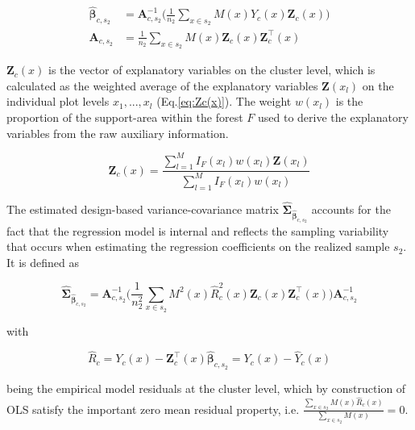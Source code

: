 \documentclass[remotesensing,article,submit,moreauthors,pdftex,10pt,a4paper]{mdpi}
\begin{document}
\begin{subequations}\label{normequ_simple_cluster}
	\begin{align}
	\hat{\pmb{\beta}}_{c,s_2} &= \pmb{A}_{c,s_2}^{-1} \Big(\frac{1}{n_2}\sum_{x\in{s_2}}M(x)Y_{c}(x)\pmb{Z}_{c}(x)\Big) \\
	\pmb{A}_{c,s_2} &=\frac{1}{n_2}\sum_{x\in{s_2}}M(x)\pmb{Z}_{c}(x)\pmb{Z}_{c}^{\top}(x)
	\end{align}
\end{subequations}

\noindent $\pmb{Z}_{c}(x)$ is the vector of explanatory variables on the cluster level, which is calculated as the weighted average of the explanatory variables $\pmb{Z}(x_l)$ on the individual plot levels $x_1, ..., x_l$ (Eq.\ref{eq:Zc(x)}). The weight $w(x_l)$ is the proportion of the support-area within the forest $F$ used to derive the explanatory variables from the raw auxiliary information.

\begin{equation}\label{eq:Zc(x)}
\pmb{Z}_{c}(x)=\frac{\sum_{l=1}^{M}I_{F}(x_l)w(x_l)\pmb{Z}(x_l)}{\sum_{l=1}^{M}I_{F}(x_l)w(x_l)}
\end{equation}

\noindent The estimated design-based variance-covariance matrix $\hat{\pmb{\Sigma}}_{\hat{\pmb{\beta}}_{c,s_2}}$ accounts for the fact that the regression model is internal and reflects the sampling variability that occurs when estimating the regression coefficients on the realized sample $s_2$. It is defined as

\begin{equation}\label{eq:varcovarbeta}
\hat{\pmb{\Sigma}}_{\hat{\pmb{\beta}}_{c,s_2}}=\pmb{A}_{c,s_2}^{-1}
\Big(\frac{1}{n_2^2}\sum_{x\in{s_2}}M^{2}(x)\hat{R}_{c}^2(x)\pmb{Z}_{c}(x)\pmb{Z}_{c}^{\top}(x)\Big)
\pmb{A}_{c,s_2}^{-1}
\end{equation}

\noindent with 

\begin{equation}\label{eq:globresids}
\hat{R}_{c}=Y_{c}(x)-\pmb{Z}_{c}^{\top}(x)\hat{\pmb{\beta}}_{c,s_2} = Y_{c}(x) - \hat{Y}_{c}(x)
\end{equation}

\noindent being the empirical model residuals at the cluster level, which by construction of OLS satisfy the important zero mean residual property, i.e. $\frac{\sum_{x \in s_{2}} M(x) \hat{R}_{c}(x)}{\sum_{x \in s_{2}} M(x)}=0$.\\
\end{document}

